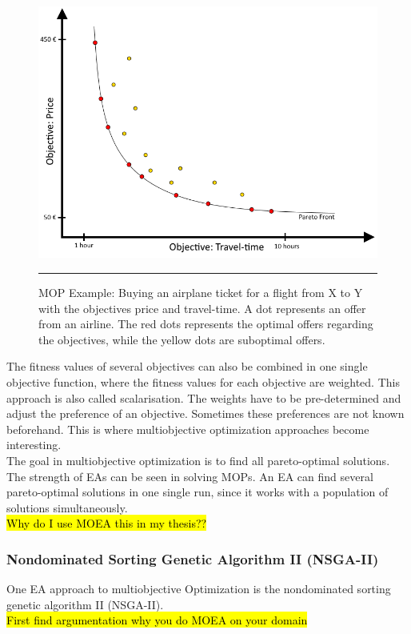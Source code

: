     \begin{figure}
        \centering
        \includegraphics[scale=0.5]{./Figures/Pareto-Example.png}
        \rule{20em}{0.5pt}
        \caption{MOP Example: Buying an airplane ticket for a flight from X to Y with the objectives price and travel-time. A dot represents an offer from an airline. The red dots represents the optimal offers regarding the objectives, while the yellow dots are suboptimal offers.}
        \label{fig:paretoExample}
    \end{figure}
    The fitness values of several objectives can also be combined in one single objective function, where the fitness values for each objective are weighted. This approach is also called scalarisation\cite{Eiben}. The weights have to be pre-determined and adjust the preference of an objective. Sometimes these preferences are not known beforehand. This is where multiobjective optimization approaches become interesting.\\
    The goal in multiobjective optimization is to find all pareto-optimal solutions. The strength of EAs can be seen in solving MOPs. An EA can find several pareto-optimal solutions in one single run, since it works with a population of solutions simultaneously\cite{Deb:2002}.\\
    \hl{Why do I use MOEA this in my thesis??}
    \subsubsection{Nondominated Sorting Genetic Algorithm II (NSGA-II)}
    One EA approach to multiobjective Optimization is the nondominated sorting genetic algorithm II (NSGA-II)\cite{Deb:2002}.\\
    \hl{First find argumentation why you do MOEA on your domain}
    
